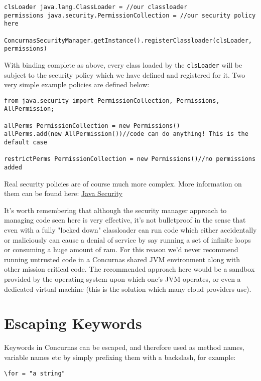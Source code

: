 \documentclass[conc-doc]{subfiles}
\begin{document}
\begin{lstlisting}
clsLoader java.lang.ClassLoader = //our classloader
permissions java.security.PermissionCollection = //our security policy here

ConcurnasSecurityManager.getInstance().registerClassloader(clsLoader, permissions)
\end{lstlisting}

With binding complete as above, every class loaded by the \lstinline{clsLoader} will be subject to the security policy which we have defined and registered for it. Two very simple example policies are defined below:

\begin{lstlisting}
from java.security import PermissionCollection, Permissions, AllPermission;

allPerms PermissionCollection = new Permissions()
allPerms.add(new AllPermission())//code can do anything! This is the default case

restrictPerms PermissionCollection = new Permissions()//no permissions added
\end{lstlisting}

Real security policies are of course much more complex. More information on them can be found here: \href{https://docs.oracle.com/javase/8/docs/technotes/guides/security/spec/security-spec.doc3.html}{Java Security}

It's worth remembering that although the security manager approach to managing code seen here is very effective, it's not bulletproof in the sense that even with a fully "locked down" classloader can run code which either accidentally or maliciously can cause a denial of service by say running a set of infinite loops or consuming a huge amount of ram. For this reason we'd never recommend running untrusted code in a Concurnas shared JVM environment along with other mission critical code. The recommended approach here would be a sandbox provided by the operating system upon which one's JVM operates, or even a dedicated virtual machine (this is the solution which many cloud providers use).

\section{Escaping Keywords}
Keywords in Concurnas can be escaped, and therefore used as method names, variable names etc by simply prefixing them with a backslash, for example:

\begin{lstlisting}
\for = "a string"
\end{lstlisting}
\end{document}
